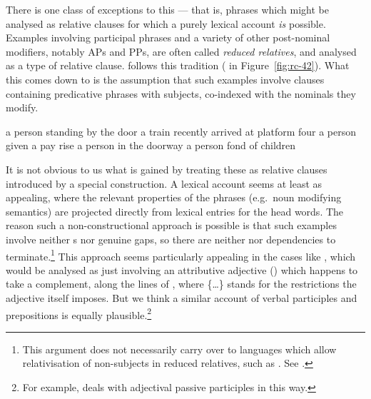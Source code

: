 \documentclass[output=paper
 	        ,biblatex
                ,babelshorthands
                ,newtxmath
                ,draftmode
                ,colorlinks, citecolor=brown
]{langscibook}
\begin{document}
There is one class of exceptions to this --- that is, phrases which might be analysed as
relative clauses for
which a purely lexical account \emph{is} possible. Examples involving participal phrases
and a variety of other post-nominal modifiers, notably APs and PPs, are often called
\emph{reduced relatives}, and analysed as a type of relative clause.  \cite[471]{Sag:97}
follows this tradition ( in Figure~\ref{fig:rc-42}). What this comes down to is the assumption that such examples
involve clauses containing predicative phrases with  subjects, co-indexed with
the nominals they modify. 
\begin{exe}\ex\begin{xlist}\label{x:rc-99}
  \settowidth{}
  \ex\label{x:rc-100} a person standing by the door 
  \ex\label{x:rc-101} a train recently arrived at platform four 
  \ex\label{x:rc-102} a person given a pay rise 
  \ex\label{x:rc-103} a person in the doorway
  \ex\label{x:rc-104} a person fond of children
\end{xlist}\end{exe}
It is not obvious to us what is gained by treating these as relative clauses introduced by
a special construction. A lexical account seems at least as appealing, where the relevant
properties of the phrases (e.g.\ noun modifying semantics) are projected directly from
lexical entries for the head words. The reason such a non-constructional approach is
possible is that such examples involve neither s nor genuine gaps, so
there are neither  nor  dependencies to terminate.\footnote{This
  argument does not necessarily carry over to languages which allow relativisation of
  non-subjects in reduced relatives, such as . See \cite[241]{Melnik:06}.
}
This
approach seems particularly appealing in the cases like , which would be
analysed as just involving an attributive adjective () which happens to take a
complement, along the lines of , where \{\ldots\} stands for the restrictions
the adjective itself imposes. But we think a similar account of verbal
participles and prepositions is equally plausible.\footnote{For example, \cite[159--164]{Mueller2002b} deals with
adjectival passive participles in this way.}
\begin{exe}\ex\label{x:rc-105}
\end{exe}
\end{document}
